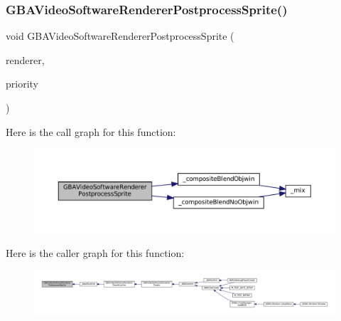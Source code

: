 \subsubsection{\texorpdfstring{G\+B\+A\+Video\+Software\+Renderer\+Postprocess\+Sprite()}{GBAVideoSoftwareRendererPostprocessSprite()}}
{\footnotesize\ttfamily void G\+B\+A\+Video\+Software\+Renderer\+Postprocess\+Sprite (\begin{DoxyParamCaption}\item[{struct G\+B\+A\+Video\+Software\+Renderer $\ast$}]{renderer,  }\item[{unsigned}]{priority }\end{DoxyParamCaption})}

Here is the call graph for this function\+:
\nopagebreak
\begin{figure}[H]
\begin{center}
\leavevmode
\includegraphics[width=350pt]{software-private_8h_a47b212d8fd0ffc36105a78d71946516b_cgraph}
\end{center}
\end{figure}
Here is the caller graph for this function\+:
\nopagebreak
\begin{figure}[H]
\begin{center}
\leavevmode
\includegraphics[width=350pt]{software-private_8h_a47b212d8fd0ffc36105a78d71946516b_icgraph}
\end{center}
\end{figure}
\mbox{\label{software-private_8h_a1f995eed921e1b4e0963fab4daf5e2da}} 

